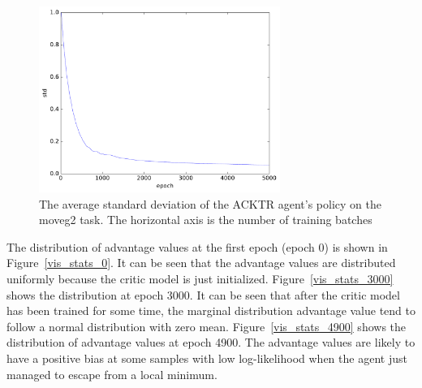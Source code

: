 \begin{figure}[!htbp]
\label{key}	\includegraphics[width=0.7\textwidth]{images/rec_180528_std_statlog.pdf}
	\centering
	\caption{The average standard deviation of the ACKTR agent's policy on the moveg2 task. The horizontal axis is the number of training batches}\label{rec_stat_moveg2_std}
\end{figure}
The distribution of advantage values at the first epoch (epoch 0) is shown in Figure~\ref{vis_stats_0}. It can be seen that the advantage values are distributed uniformly because the critic model is just initialized. Figure~\ref{vis_stats_3000} shows the distribution at epoch 3000. It can be seen that after the critic model has been trained for some time, the marginal distribution advantage value tend to follow a normal distribution with zero mean.  Figure~\ref{vis_stats_4900} shows the distribution of advantage values at epoch 4900. The advantage values are likely to have a positive bias at some samples with low log-likelihood  when the agent just managed to escape from a local minimum.  

